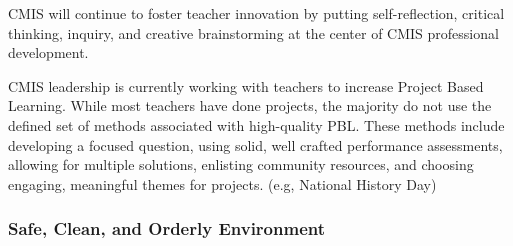 \begin{findings}

CMIS will continue to foster teacher innovation by putting self-reflection, critical thinking, inquiry, and creative brainstorming at the center of CMIS professional development.

CMIS leadership is currently working with teachers to increase Project Based Learning. While most teachers have done projects, the majority do not use the defined set of methods associated with high-quality PBL. These methods include developing a focused question, using solid, well crafted performance assessments, allowing for multiple solutions, enlisting community resources, and choosing engaging, meaningful themes for projects.  (e.g, National History Day)
\end{findings}

\subsubsection{Safe, Clean, and Orderly Environment}



